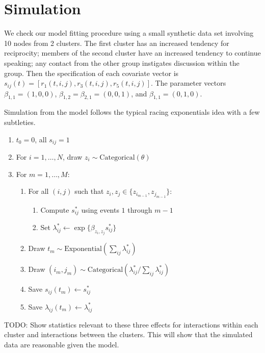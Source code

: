 \documentclass[11pt]{article}
\begin{document}
\section{Simulation}

We check our model fitting procedure using a small synthetic data set involving 10 nodes from 2 clusters.  The first cluster has an increased tendency for reciprocity; members of the second cluster have an increased tendency to continue speaking; any contact from the other group instigates discussion within the group.  Then the specification of each covariate vector is $s_{ij}(t) = [r_1(t,i,j), r_3(t,i,j), r_5(t,i,j)]$.  The parameter vectors $\beta_{1,1} = (1,0,0)$,  $\beta_{1,2} = \beta_{2,1} = (0,0,1)$, and $\beta_{1,1} = (0,1,0)$.

Simulation from the model follows the typical racing exponentials idea with a few subtleties.

\begin{enumerate}
\item $t_0 = 0$, all $s_{ij} = 1$
\item For $i = 1, \ldots, N$, draw $z_i \sim \mbox{Categorical}(\theta)$
\item For $m = 1, \ldots, M$:
  \begin{enumerate}
  \item For all $(i,j)$ such that $z_i,z_j \in \{z_{i_{m-1}},z_{j_{m-1}}\}$:
    \begin{enumerate}
    \item Compute $s_{ij}^*$ using events $1$ through $m-1$
    \item Set $\lambda_{ij}^* \leftarrow \exp\{ \beta_{z_i,z_j} s_{ij}^*\}$ 
    \end{enumerate}
  \item Draw $t_m \sim \mbox{Exponential}\left(\sum_{ij} \lambda_{ij}^*\right)$
  \item Draw $(i_m,j_m) \sim \mbox{Categorical}\left(\lambda_{ij}^* / \sum_{ij}\lambda_{ij}^*\right)$
  \item Save $s_{ij}(t_m) \leftarrow s_{ij}^*$
  \item Save $\lambda_{ij}(t_m) \leftarrow \lambda_{ij}^*$
  \end{enumerate}
\end{enumerate}

TODO: Show statistics relevant to these three effects for interactions within each cluster and interactions between the clusters.  This will show that the simulated data are reasonable given the model.
\end{document}
